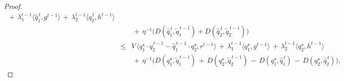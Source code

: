 \documentclass[12pt, final]{l4dc2023}
\begin{document}
\begin{proof}
\begin{equation}
\begin{array}{rcl}
	\,+\,
	\lambda_1^{t-1} \langle{\hat q_1^{\,t}},{g^{t-1}}\rangle 
	\,+\,\lambda_2^{t-1} \langle{ \hat q_2^{\,t}},{h^{t-1}}\rangle 
	\\[0.2cm]
	&& \!\!\!\! \!\!\!\! \!\! \,+\, \eta^{-1} \big(D(\hat q_1^{\,t}, \tilde q_1^{\,t-1}) + D(\hat q_2^{\,t}, \tilde q_2^{\,t-1})\big)
	\\[0.2cm]
	&\leq&  V\, \big\langle{ q_1^\star\cdot \hat q_2^{\,t-1}-\hat q_1^{\,t-1}\cdot  q_2^\star },{r^{t-1}}\big\rangle 
	\,+\,
	\lambda_1^{t-1} \langle{ q_1^\star},{g^{t-1}}\rangle 
	\,+\,\lambda_2^{t-1} \langle{ q_2^\star},{h^{t-1}}\rangle 
	\\[0.2cm]
	&& \,+\, \eta^{-1} \big(D( q_1^\star,\tilde q_1^{\,t-1}) \,+\, D( q_2^\star, \tilde q_2^{\,t-1}) \,-\, D( q_1^\star,\hat q_1^{\,t}) \,-\, D( q_2^\star, \hat q_2^{\,t}) \big).
	\end{array}
	\end{equation}
	

\end{proof}
\end{document}

